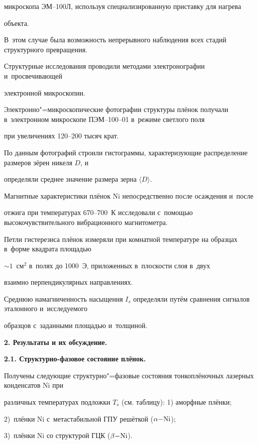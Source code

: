 микроскопа ЭМ--100Л, используя специализированную приставку для нагрева

объекта.

В~этом случае была возможность непрерывного наблюдения всех стадий структурного превращения.



Структурные исследования проводили методами электронографии и~просвечивающей

электронной микроскопии.

Электронно"=микроскопические фотографии структуры плёнок получали в~электронном микроскопе ПЭМ--100--01 в~режиме светлого поля

при увеличениях 120--200 тысяч крат.

По данным фотографий строили гистограммы, характеризующие распределение размеров зёрен никеля $D$, и

определяли среднее значение размера зерна $\langle D \rangle $.



Магнитные характеристики плёнок Ni непосредственно после осаждения и~после

отжига при температурах 670--700~К исследовали с~помощью высокочувствительного вибрационного магнитометра.

Петли гистерезиса плёнок измеряли при комнатной температуре на образцах в~форме квадрата площадью

$\sim  1$~см$^{2}$ в~полях до 1000~Э, приложенных в~плоскости слоя в~двух

взаимно перпендикулярных направлениях.

Среднюю намагниченность насыщения $I_{s}$ определяли путём сравнения сигналов эталонного и~исследуемого

образцов с~заданными площадью и~толщиной.



\textbf{2. Результаты и их обсуждение.}



\textbf{2.1. Структурно-фазовое состояние плёнок.}

Получены следующие структурно"=фазовые состояния тонкоплёночных лазерных конденсатов Ni при

различных температурах подложки $T_{s}$ (см. таблицу): 1) аморфные плёнки; \linebreak

2)~плёнки Ni с~метастабильной ГПУ решёткой ($\alpha \rm {-}Ni$);

3)~плёнки Ni со структурой ГЦК ($\beta \rm {-}Ni$).



